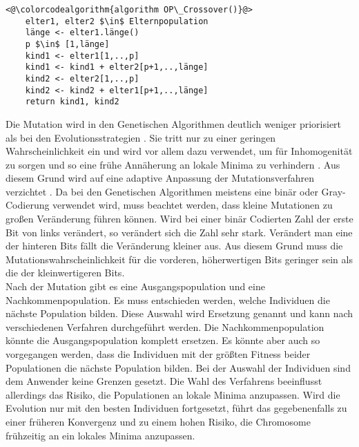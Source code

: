 \begin{lstlisting}[caption={One-Point-Crossover}, firstnumber=1, captionpos=b,label=lst:crossover]
<@\colorcodealgorithm{algorithm OP\_Crossover()}@>
	elter1, elter2 $\in$ Elternpopulation
	länge <- elter1.länge()
	p $\in$ [1,länge]
	kind1 <- elter1[1,..,p]
	kind1 <- kind1 + elter2[p+1,..,länge]
	kind2 <- elter2[1,..,p]
	kind2 <- kind2 + elter1[p+1,..,länge]
	return kind1, kind2
\end{lstlisting}
Die Mutation wird in den Genetischen Algorithmen deutlich weniger priorisiert als bei den Evolutionsstrategien \cite[S.~200]{schoeneburg}. Sie tritt nur zu einer geringen Wahrscheinlichkeit ein und wird vor allem dazu verwendet, um für Inhomogenität zu sorgen und so eine frühe Annäherung an lokale Minima zu verhindern \cite[S.~200]{schoeneburg}.
Aus diesem Grund wird auf eine adaptive Anpassung der Mutationsverfahren verzichtet \cite[S.~200]{schoeneburg}. Da bei den Genetischen Algorithmen meistens eine binär oder Gray-Codierung verwendet wird, muss beachtet werden, dass kleine Mutationen zu großen Veränderung führen können.
Wird bei einer binär Codierten Zahl der erste Bit von links verändert, so verändert sich die Zahl sehr stark. Verändert man eine der hinteren Bits fällt die Veränderung kleiner aus. Aus diesem Grund muss die Mutationswahrscheinlichkeit für die vorderen, höherwertigen Bits geringer sein als die der kleinwertigeren Bits.\\
Nach der Mutation gibt es eine Ausgangspopulation und eine Nachkommenpopulation. Es muss entschieden werden, welche Individuen die nächste Population bilden. Diese Auswahl wird Ersetzung genannt und kann nach verschiedenen Verfahren durchgeführt werden.
Die Nachkommenpopulation könnte die Ausgangspopulation komplett ersetzen. Es könnte aber auch so vorgegangen werden, dass die Individuen mit der größten Fitness beider Populationen die nächste Population bilden. Bei der Auswahl der Individuen sind dem Anwender keine Grenzen gesetzt. Die Wahl des Verfahrens beeinflusst allerdings das Risiko, die Populationen an lokale Minima anzupassen. Wird die Evolution nur mit den besten Individuen fortgesetzt, führt das gegebenenfalls zu einer früheren Konvergenz und zu einem hohen Risiko, die Chromosome frühzeitig an ein lokales Minima anzupassen. 

